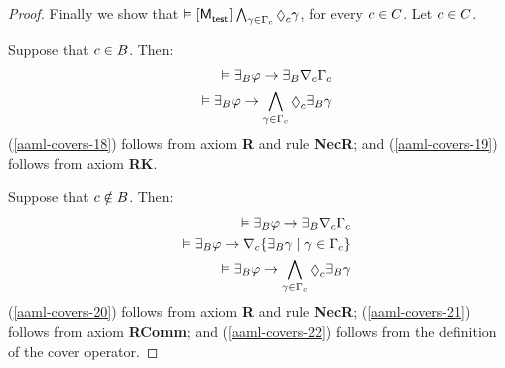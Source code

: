 \begin{proof}
Finally we show that $\entails \actionA{\aPModel{\aStateTest}} \bigwedge_{\gamma \in \Gamma_\agentC} \possibleC \gamma$, for every $c \in C$.
Let $c \in C$.

Suppose that $c \in B$.
Then:
\begin{eqnarray}
    &&\entails \someactsBs \phi \implies \someactsBs \coversC \Gamma_\agentC \label{aaml-covers-18}\\
    &&\entails \someactsBs \phi \implies \bigwedge_{\gamma \in \Gamma_\agentC} \possibleC \someactsBs \gamma \label{aaml-covers-19}
\end{eqnarray}
(\ref{aaml-covers-18}) follows from \axiomAamlK{} axiom {\bf R} and rule {\bf NecR}; and
(\ref{aaml-covers-19}) follows from \axiomAamlK{} axiom {\bf RK}.

Suppose that $c \notin B$.
Then:
\begin{eqnarray}
    &&\entails \someactsBs \phi \implies \someactsBs \coversC \Gamma_\agentC \label{aaml-covers-20}\\
    &&\entails \someactsBs \phi \implies \coversC \{\someactsBs \gamma \mid \gamma \in \Gamma_\agentC \}\label{aaml-covers-21}\\
    &&\entails \someactsBs \phi \implies \bigwedge_{\gamma \in \Gamma_\agentC} \possibleC \someactsBs \gamma \label{aaml-covers-22}
\end{eqnarray}
(\ref{aaml-covers-20}) follows from \axiomAamlK{} axiom {\bf R} and rule {\bf NecR};
(\ref{aaml-covers-21}) follows from \axiomAamlK{} axiom {\bf RComm}; and
(\ref{aaml-covers-22}) follows from the definition of the cover operator.


\end{proof}
